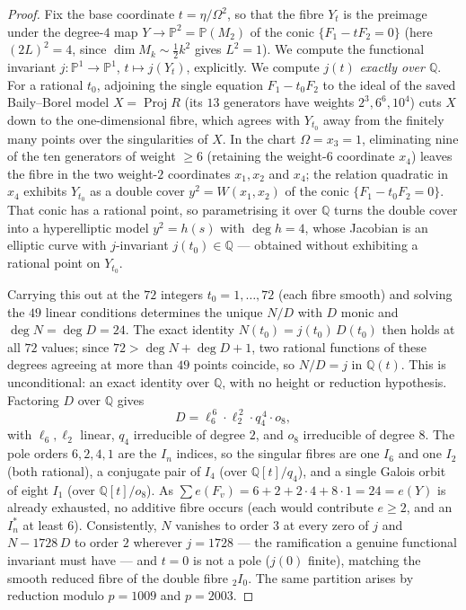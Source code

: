 \documentclass[11pt]{article}
\theoremstyle{definition}
\DeclareMathOperator{\Proj}{Proj}
\newcommand{\bP}{\mathbb{P}}
\newcommand{\bQ}{\mathbb{Q}}
\newcommand{\Om}{\Omega}
\begin{document}
\begin{proof}
Fix the base coordinate $t=\eta/\Om^2$, so that the fibre $Y_t$ is the preimage
under the degree-$4$ map $Y\to\bP^2=\bP(M_2)$ of the conic $\{F_1-tF_2=0\}$
(here $(2L)^2=4$, since $\dim M_k\sim\tfrac12k^2$ gives $L^2=1$). We compute the
functional invariant $j\colon\bP^1\to\bP^1$, $t\mapsto j(Y_t)$, explicitly.
We compute $j(t)$ \emph{exactly over $\bQ$}. For a rational $t_0$, adjoining the
single equation $F_1-t_0F_2$ to the ideal of the saved Baily--Borel model
$X=\Proj R$ (its $13$ generators have weights $2^3,6^6,10^4$) cuts $X$ down to the
one-dimensional fibre, which agrees with $Y_{t_0}$ away from the finitely many
points over the singularities of $X$. In the chart $\Om=x_3=1$, eliminating nine
of the ten generators of weight $\ge6$ (retaining the weight-$6$ coordinate
$x_4$) leaves the fibre in the two weight-$2$ coordinates $x_1,x_2$ and $x_4$; the
relation quadratic in $x_4$ exhibits $Y_{t_0}$ as a double cover $y^2=W(x_1,x_2)$
of the conic $\{F_1-t_0F_2=0\}$. That conic has a rational point, so parametrising
it over $\bQ$ turns the double cover into a hyperelliptic model $y^2=h(s)$ with
$\deg h=4$, whose Jacobian is an elliptic curve with $j$-invariant $j(t_0)\in\bQ$
--- obtained without exhibiting a rational point on $Y_{t_0}$.

Carrying this out at the $72$ integers $t_0=1,\dots,72$ (each fibre smooth) and
solving the $49$ linear conditions determines the unique $N/D$ with $D$ monic and
$\deg N=\deg D=24$. The exact identity $N(t_0)=j(t_0)\,D(t_0)$ then holds at all
$72$ values; since $72>\deg N+\deg D+1$, two rational functions of these degrees
agreeing at more than $49$ points coincide, so $N/D=j$ in $\bQ(t)$. This is
unconditional: an exact identity over $\bQ$, with no height or reduction
hypothesis. Factoring $D$ over $\bQ$ gives
\[
   D=\ell_6^{\,6}\cdot \ell_2^{\,2}\cdot q_4^{\,4}\cdot o_8,
\]
with $\ell_6,\ell_2$ linear, $q_4$ irreducible of degree $2$, and $o_8$
irreducible of degree $8$. The pole orders $6,2,4,1$ are the $I_n$ indices, so the
singular fibres are one $I_6$ and one $I_2$ (both rational), a conjugate pair of
$I_4$ (over $\bQ[t]/q_4$), and a single Galois orbit of eight $I_1$ (over
$\bQ[t]/o_8$). As $\sum e(F_v)=6+2+2\cdot4+8\cdot1=24=e(Y)$ is already exhausted,
no additive fibre occurs (each would contribute $e\ge2$, and an $I_n^{*}$ at least
$6$). Consistently, $N$ vanishes to order $3$ at every zero of $j$ and $N-1728\,D$
to order $2$ wherever $j=1728$ --- the ramification a genuine functional invariant
must have --- and $t=0$ is not a pole ($j(0)$ finite), matching the smooth reduced
fibre of the double fibre ${}_2I_0$. The same partition arises by reduction modulo
$p=1009$ and $p=2003$.
\end{proof}
\end{document}
